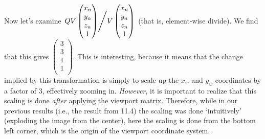 \documentclass[11pt]{tingpset}
\begin{document}
    Now let's examine
    $\left.
    QV \begin{pmatrix}
      x_n \\
      y_n \\
      z_n \\
      1
    \end{pmatrix}
    \middle/
    V \begin{pmatrix}
        x_n \\
        y_n \\
        z_n \\
        1
    \end{pmatrix}
    \right.
    $ (that is, element-wise divide). We find that this gives
    $
      \begin{pmatrix}
        3 \\
        3 \\
        1 \\
        1 \\
      \end{pmatrix}
    $. This is interesting, because it means that the change implied by this transformation is simply to scale up the $x_w$ and $y_w$ coordinates by a factor of 3, effectively zooming in. \emph{However}, it is important to realize that this scaling is done \emph{after} applying the viewport matrix. Therefore, while in our previous results (i.e., the result from 11.4) the scaling was done `intuitively' (exploding the image from the center), here the scaling is done from the bottom left corner, which is the origin of the viewport coordinate system.



  \todo


  \todo
\end{document}
